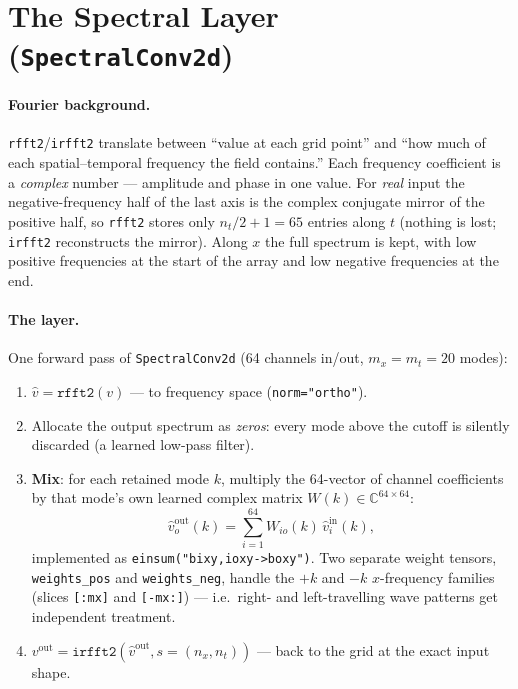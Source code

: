 \documentclass[11pt,a4paper]{article}
\begin{document}
\section{The Spectral Layer (\texttt{SpectralConv2d})}
\label{sec:spectral}

\paragraph{Fourier background.} \texttt{rfft2}/\texttt{irfft2} translate between
``value at each grid point'' and ``how much of each spatial--temporal frequency
the field contains.'' Each frequency coefficient is a \emph{complex} number ---
amplitude and phase in one value. For \emph{real} input the negative-frequency
half of the last axis is the complex conjugate mirror of the positive half, so
\texttt{rfft2} stores only $n_t/2 + 1 = 65$ entries along $t$ (nothing is lost;
\texttt{irfft2} reconstructs the mirror). Along $x$ the full spectrum is kept,
with low positive frequencies at the start of the array and low negative
frequencies at the end.

\paragraph{The layer.} One forward pass of \texttt{SpectralConv2d}
(64 channels in/out, $m_x = m_t = 20$ modes):
\begin{enumerate}[nosep]
  \item $\hat v = \texttt{rfft2}(v)$ --- to frequency space (\texttt{norm="ortho"}).
  \item Allocate the output spectrum as \emph{zeros}: every mode above the
        cutoff is silently discarded (a learned low-pass filter).
  \item \textbf{Mix}: for each retained mode $k$, multiply the 64-vector of
        channel coefficients by that mode's own learned complex matrix
        $W(k) \in \mathbb{C}^{64\times 64}$:
        \begin{equation}
          \hat v^{\mathrm{out}}_o(k) = \sum_{i=1}^{64} W_{io}(k)\, \hat v^{\mathrm{in}}_i(k),
        \end{equation}
        implemented as \texttt{einsum("bixy,ioxy->boxy")}. Two separate weight
        tensors, \texttt{weights\_pos} and \texttt{weights\_neg}, handle the
        $+k$ and $-k$ $x$-frequency families (slices \texttt{[:mx]} and
        \texttt{[-mx:]}) --- i.e.\ right- and left-travelling wave patterns get
        independent treatment.
  \item $v^{\mathrm{out}} = \texttt{irfft2}(\hat v^{\mathrm{out}}, s{=}(n_x, n_t))$
        --- back to the grid at the exact input shape.
\end{enumerate}
\end{document}
